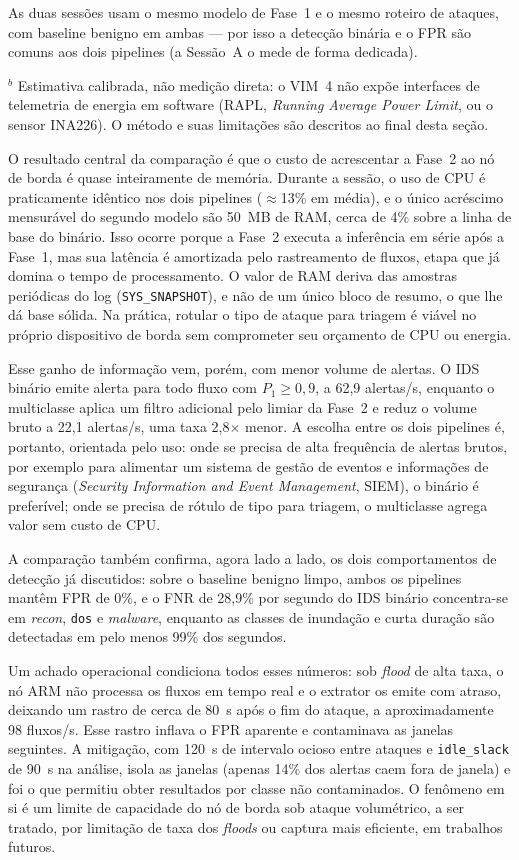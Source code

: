 \documentclass[12pt]{article}
\begin{document}
\noindent As duas sessões usam o mesmo modelo de Fase~1 e o mesmo roteiro de
ataques, com baseline benigno em ambas — por isso a detecção binária e o FPR são
comuns aos dois pipelines (a Sessão~A o mede de forma dedicada).

\noindent$^{b}$ Estimativa calibrada, não medição direta: o VIM~4 não
expõe interfaces de telemetria de energia em software (RAPL, \textit{Running
Average Power Limit}, ou o sensor INA226). O método e suas limitações são
descritos ao final desta seção.

O resultado central da comparação é que o custo de acrescentar a Fase~2 ao nó de
borda é quase inteiramente de memória. Durante a sessão, o uso de CPU é
praticamente idêntico nos dois pipelines ($\approx$13\% em média), e o único
acréscimo mensurável do segundo modelo são 50~MB de RAM, cerca de 4\% sobre a
linha de base do binário. Isso ocorre porque a Fase~2 executa a inferência em
série após a Fase~1, mas sua latência é amortizada pelo rastreamento de fluxos,
etapa que já domina o tempo de processamento. O valor de RAM deriva das amostras
periódicas do log (\texttt{SYS\_SNAPSHOT}), e não de um único bloco de resumo, o
que lhe dá base sólida. Na prática, rotular o tipo de ataque para triagem é
viável no próprio dispositivo de borda sem comprometer seu orçamento de CPU ou
energia.

Esse ganho de informação vem, porém, com menor volume de alertas. O IDS binário
emite alerta para todo fluxo com $P_1 \geq 0{,}9$, a 62,9 alertas/s, enquanto o
multiclasse aplica um filtro adicional pelo limiar da Fase~2 e reduz o volume
bruto a 22,1 alertas/s, uma taxa 2,8$\times$ menor. A escolha entre os dois
pipelines é, portanto, orientada pelo uso: onde se precisa de alta frequência de
alertas brutos, por exemplo para alimentar um sistema de gestão de eventos e
informações de segurança (\textit{Security Information and Event Management},
SIEM), o binário é preferível; onde se precisa de rótulo de tipo para triagem, o
multiclasse agrega valor sem custo de CPU.

A comparação também confirma, agora lado a lado, os dois comportamentos de
detecção já discutidos: sobre o baseline benigno limpo, ambos os pipelines
mantêm FPR de 0\%, e o FNR de 28,9\% por segundo do IDS binário concentra-se em
\textit{recon}, \texttt{dos} e \textit{malware}, enquanto as classes de inundação
e curta duração são detectadas em pelo menos 99\% dos segundos.

Um achado operacional condiciona todos esses números: sob \textit{flood} de alta
taxa, o nó ARM não processa os fluxos em tempo real e o extrator os emite com
atraso, deixando um rastro de cerca de 80~s após o fim do ataque, a
aproximadamente 98 fluxos/s. Esse rastro inflava o FPR aparente e contaminava as
janelas seguintes. A mitigação, com 120~s de intervalo ocioso entre ataques e
\texttt{idle\_slack} de 90~s na análise, isola as janelas (apenas 14\% dos
alertas caem fora de janela) e foi o que permitiu obter resultados por classe não
contaminados. O fenômeno em si é um limite de capacidade do nó de borda sob
ataque volumétrico, a ser tratado, por limitação de taxa dos \textit{floods} ou
captura mais eficiente, em trabalhos futuros.
\end{document}
